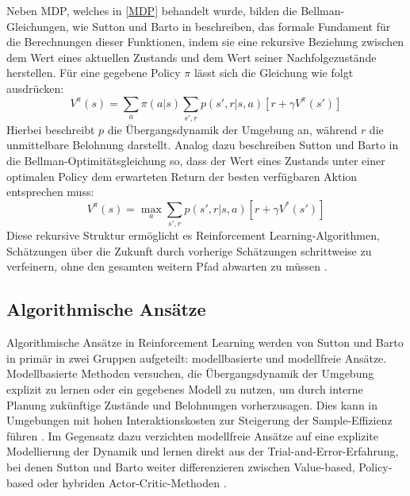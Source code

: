 Neben MDP, welches in \autoref{MDP} behandelt wurde, bilden die Bellman-Gleichungen, wie Sutton und Barto in \cite{sutton2018reinforcement} beschreiben, das formale Fundament für die Berechnungen dieser Funktionen, indem sie eine rekursive Beziehung zwischen dem Wert eines aktuellen Zustands und dem Wert seiner Nachfolgezustände herstellen. Für eine gegebene Policy $\pi$ lässt sich die Gleichung wie folgt ausdrücken:
\begin{equation}
	V^{\pi}(s) = \sum_{a}\pi(a|s)\sum_{s',r}p(s',r|s,a)[r+\gamma V^{\pi}(s')]
\end{equation}
Hierbei beschreibt $p$ die Übergangsdynamik der Umgebung an, während $r$ die unmittelbare Belohnung darstellt. Analog dazu beschreiben Sutton und Barto in \cite{sutton2018reinforcement} die Bellman-Optimitätsgleichung so, dass der Wert eines Zustands unter einer optimalen Policy dem erwarteten Return der besten verfügbaren Aktion entsprechen muss:
\begin{equation}
	V^{\pi}(s) = \max_a\sum_{s',r}p(s',r|s,a)[r+\gamma V^{*}(s')]
\end{equation}
Diese rekursive Struktur ermöglicht es Reinforcement Learning-Algorithmen, Schätzungen über die Zukunft durch vorherige Schätzungen schrittweise zu verfeinern, ohne den gesamten weitern Pfad abwarten zu müssen \cite{sutton2018reinforcement, arulkumaranDRL2017}.
\subsection{Algorithmische Ansätze} \label{algo_rl}
Algorithmische Ansätze in Reinforcement Learning werden von Sutton und Barto in \cite{sutton2018reinforcement} primär in zwei Gruppen aufgeteilt: modellbasierte und modellfreie Ansätze. Modellbasierte Methoden versuchen, die Übergangsdynamik der Umgebung explizit zu lernen oder ein gegebenes Modell zu nutzen, um durch interne Planung zukünftige Zustände und Belohnungen vorherzusagen. Dies kann in Umgebungen mit hohen Interaktionskosten zur Steigerung der Sample-Effizienz führen \cite{arulkumaranDRL2017}. \newline
Im Gegensatz dazu verzichten modellfreie Ansätze auf eine explizite Modellierung der Dynamik und lernen direkt aus der Trial-and-Error-Erfahrung, bei denen Sutton und Barto weiter differenzieren zwischen Value-based, Policy-based oder hybriden Actor-Critic-Methoden \cite{sutton2018reinforcement}.

